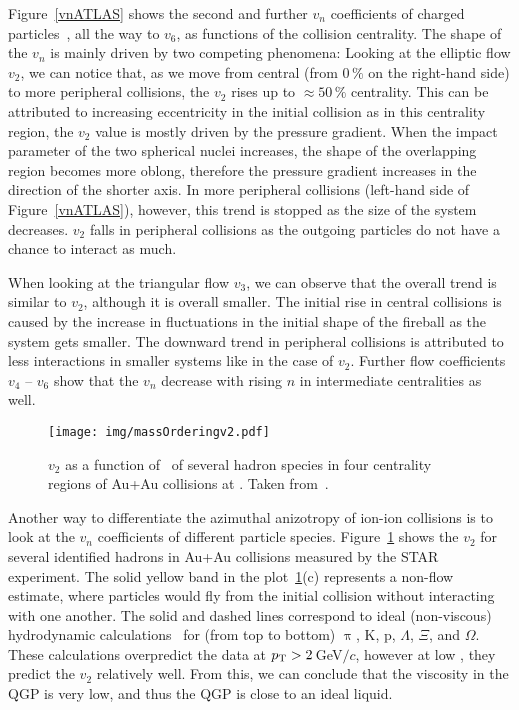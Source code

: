 Figure~\ref{vnATLAS} shows the second and further $v_n$ coefficients of charged particles~\cite{vnATLAS}, all the way to $v_6$, as functions of the collision centrality\@. The shape of the $v_n$ is mainly driven by two competing phenomena: Looking at the elliptic flow $v_2$, we can notice that, as we move from central (from 0$\,\%$ on the right-hand side) to more peripheral collisions, the $v_2$ rises up to $\approx50\,\%$ centrality. This can be attributed to increasing eccentricity in the initial collision as in this centrality region, the $v_2$ value is mostly driven by the pressure gradient. When the impact parameter of the two spherical nuclei increases, the shape of the overlapping region becomes more oblong, therefore the pressure gradient increases in the direction of the shorter axis. In more peripheral collisions (left-hand side of Figure~\ref{vnATLAS}), however, this trend is stopped as the size of the system decreases. $v_2$ falls in peripheral collisions as the outgoing particles do not have a chance to interact as much.

When looking at the triangular flow $v_3$, we can observe that the overall trend is similar to $v_2$, although it is overall smaller. The initial rise in central collisions is caused by the increase in fluctuations in the initial shape of the fireball as the system gets smaller. The downward trend in peripheral collisions is attributed to less interactions in smaller systems like in the case of $v_2$\@. Further flow coefficients $v_4$ -- $v_6$ show that the $v_n$ decrease with rising $n$ in intermediate centralities as well.

\begin{figure}[!htb]
\centering
\texttt{[image: img/massOrderingv2.pdf]}
\caption[$v_2$ as a function of \pt\ of several hadron species in four centrality regions of Au+Au collisions.]{\label{massOrdering}$v_2$ as a function of \pt\ of several hadron species in four centrality regions of Au+Au collisions at \snnFull\@. Taken from~\cite{StrangeAndChargedv2paper}.}

\end{figure}

 


Another way to differentiate the azimuthal anizotropy of ion-ion collisions is to look at the $v_n$ coefficients of different particle species. Figure~\ref{massOrdering} shows the $v_2$ for several identified hadrons in Au+Au collisions measured by the STAR experiment. The solid yellow band in the plot~\ref{massOrdering}(c) represents a non-flow estimate, where particles would fly from the initial collision without interacting with one another. The solid and dashed lines correspond to ideal (non-viscous) hydrodynamic calculations~\cite{idealHydroReview} for (from top to bottom) $\uppi$, K, p, $\Lambda$, $\Xi$, and $\Omega$\@. These calculations overpredict the data at ${p_{\mathrm{T}}} > 2\,$GeV$/c$, however at low \pt, they predict the $v_2$ relatively well. From this, we can conclude that the viscosity in the QGP is very low, and thus the QGP is close to an ideal liquid. 


